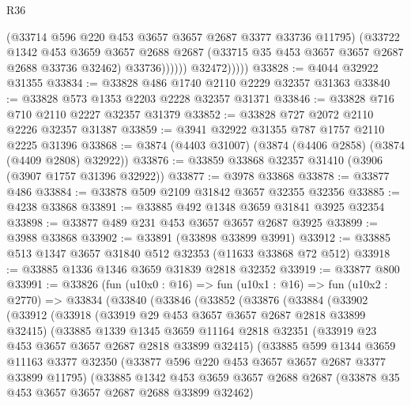 \begin{lexlean}{R36}
\begin{coremodule}
                        (@33714 @596 @220 @453 @3657 @3657 @2687 @3377 @33736 @11795)
                        (@33722
                          @1342
                          @453
                          @3659
                          @3657
                          @2688
                          @2687
                          (@33715 @35 @453 @3657 @3657 @2687 @2688 @33736 @32462)
                          @33736))))))
              @32472)))))
@33828 := @4044 @32922 @31355
@33834 := @33828 @486 @1740 @2110 @2229 @32357 @31363
@33840 := @33828 @573 @1353 @2203 @2228 @32357 @31371
@33846 := @33828 @716 @710 @2110 @2227 @32357 @31379
@33852 := @33828 @727 @2072 @2110 @2226 @32357 @31387
@33859 := @3941 @32922 @31355 @787 @1757 @2110 @2225 @31396
@33868 := @3874 (@4403 @31007) (@3874 (@4406 @2858) (@3874 (@4409 @2808) @32922))
@33876 := @33859 @33868 @32357 @31410 (@3906 (@3907 @1757 @31396 @32922))
@33877 := @3978 @33868
@33878 := @33877 @486
@33884 := @33878 @509 @2109 @31842 @3657 @32355 @32356
@33885 := @4238 @33868
@33891 := @33885 @492 @1348 @3659 @31841 @3925 @32354
@33898 := @33877 @489 @231 @453 @3657 @3657 @2687 @3925
@33899 := @3988 @33868
@33902 := @33891 (@33898 @33899 @3991)
@33912 := @33885 @513 @1347 @3657 @31840 @512 @32353 (@11633 @33868 @72 @512)
@33918 := @33885 @1336 @1346 @3659 @31839 @2818 @32352
@33919 := @33877 @800
@33991 := @33826
    (fun (u10x0 : @16) =>
    fun (u10x1 : @16) =>
    fun (u10x2 : @2770) =>
    @33834
      (@33840
        (@33846
          (@33852
            (@33876
              (@33884
                (@33902
                  (@33912
                    (@33918
                      (@33919 @29 @453 @3657 @3657 @2687 @2818 @33899 @32415)
                      (@33885
                        @1339
                        @1345
                        @3659
                        @11164
                        @2818
                        @32351
                        (@33919 @23 @453 @3657 @3657 @2687 @2818 @33899 @32415)
                        (@33885
                          @599
                          @1344
                          @3659
                          @11163
                          @3377
                          @32350
                          (@33877 @596 @220 @453 @3657 @3657 @2687 @3377 @33899 @11795)
                          (@33885
                            @1342
                            @453
                            @3659
                            @3657
                            @2688
                            @2687
                            (@33878 @35 @453 @3657 @3657 @2687 @2688 @33899 @32462)

\end{coremodule}
\end{lexlean}
